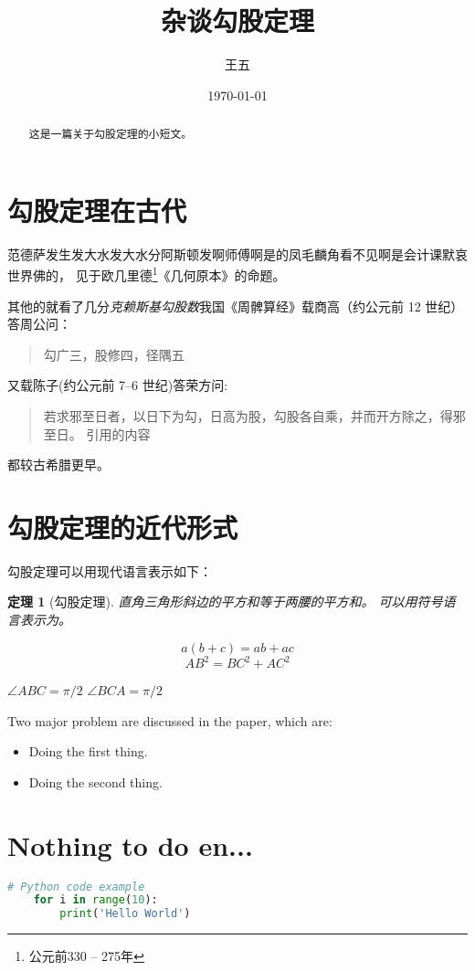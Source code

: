 \documentclass[12pt]{article}
\title{杂谈勾股定理}
\author{王五}
\date{\today}
\newtheorem{thm}{定理}
\newenvironment{myquote}{\begin{quote}\zihao{5}\kaishu}{\end{quote}}
\newcommand\an{\angle}
\begin{document}
\maketitle
\begin{abstract}
    这是一篇关于勾股定理的小短文。
\end{abstract}
\tableofcontents
\section{勾股定理在古代}

范德萨发生发大水发大水分阿斯顿发啊师傅啊是的凤毛麟角看不见啊是会计课默哀世界佛的，
见于欧几里德\footnote{公元前330 -- 275年}《几何原本》的命题。

其他的就看了几分\emph{克赖斯基勾股数}我国《周髀算经》载商高（约公元前 12 世纪）答周公问：
\begin{myquote}
    勾广三，股修四，径隅五
\end{myquote}
又载陈子(约公元前 7--6 世纪)答荣方问:
\begin{quote}
    若求邪至日者，以日下为勾，日高为股，勾股各自乘，并而开方除之，得邪至日。
    \kaishu 引用的内容
\end{quote}
都较古希腊更早。

\section{勾股定理的近代形式}

勾股定理可以用现代语言表示如下：
\begin{thm}[勾股定理]
    直角三角形斜边的平方和等于两腰的平方和。
    可以用符号语言表示为。

\end{thm}
\begin{equation}
    a(b + c) = ab + ac
\end{equation}
\begin{equation}
    AB^2 = BC^2 + AC^2
\end{equation}

$\angle ABC = \pi / 2$
$\an BCA = \pi / 2$


Two major problem are discussed in the paper, which are: 
\begin{itemize}
    \item Doing the first thing.
    \item Doing the second thing.
\end{itemize}


\section{Nothing to do en...}


\begin{lstlisting}[language=Python, name={test.py}]
    # Python code example
    for i in range(10):
        print('Hello World')
\end{lstlisting}
\end{document}

